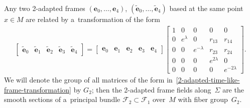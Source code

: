 \documentclass[pdftex]{sigma}
\numberwithin{equation}{section}
\theoremstyle{definition}
\begin{document}
Any two 2-adapted frames $(\mathbf{e}_0, \ldots, \mathbf{e}_4)$, $(\tilde{\mathbf{e}}_0, \ldots, \tilde{\mathbf{e}}_4)$
based at the same point $x \in M$ are related by a~transformation of the form
\begin{gather}
\begin{bmatrix}
\tilde{\mathbf{e}}_0 & \tilde{\mathbf{e}}_1 & \tilde{\mathbf{e}}_2 & \tilde{\mathbf{e}}_3 & \tilde{\mathbf{e}}_4
\end{bmatrix}
=
\begin{bmatrix}
\mathbf{e}_0 & \mathbf{e}_1 & \mathbf{e}_2 & \mathbf{e}_3 & \mathbf{e}_4
\end{bmatrix}
\begin{bmatrix}
1 & 0 & 0 & 0 & 0
\\
0 & e^{\lambda} & 0 & r_{13} & r_{14}
\\
0 & 0 & e^{-\lambda} & r_{23} & r_{24}
\\
0 & 0 & 0 & e^{2\lambda} & 0
\\
0 & 0 & 0 & 0 & e^{-2\lambda}
\end{bmatrix}.
\label{2-adapted-time-like-frame-transformation}
\end{gather}
We will denote the group of all matrices of the form in~\eqref{2-adapted-time-like-frame-transformation} by $G_2$; then
the 2-adapted frame f\/ields along~$\Sigma$ are the smooth sections of a~principal bundle $\mathcal{F}_2 \subset
\mathcal{F}_1$ over~$M$ with f\/iber group~$G_2$.
\end{document}
